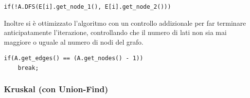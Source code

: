 \documentclass[]{article}
\begin{document}
\begin{flushleft}
\lstset{language=c++, style=mystyle, firstnumber=5}
\begin{lstlisting}
if(!A.DFS(E[i].get_node_1(), E[i].get_node_2()))
\end{lstlisting}

\medskip
Inoltre si è ottimizzato l'algoritmo con un controllo addizionale per far terminare anticipatamente l'iterazione, controllando che il numero di lati non sia mai maggiore o uguale al numero di nodi del grafo.

\lstset{language=c++, style=mystyle, firstnumber=7}
\begin{lstlisting}
if(A.get_edges() == (A.get_nodes() - 1))
    break;
\end{lstlisting}
\end{flushleft}
\subsubsection{Kruskal (con Union-Find)}
\end{document}

